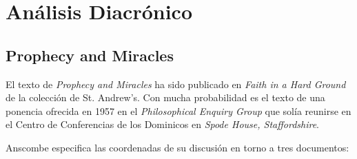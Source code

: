 \section{Análisis Diacrónico}

\subsection{Prophecy and Miracles}

El texto de \emph{Prophecy and Miracles} ha sido publicado en \emph{Faith in a
  Hard Ground} de la colección de St. Andrew's. Con mucha probabilidad es el
texto de una ponencia ofrecida en 1957 en el \emph{Philosophical Enquiry Group}
que solía reunirse en el Centro de Conferencias de los Dominicos en \emph{Spode
  House, Staffordshire}.

Anscombe especifica las coordenadas de su discusión en torno a tres documentos:
